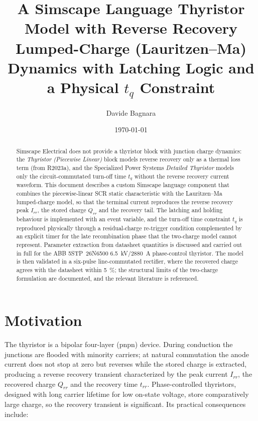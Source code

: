 \documentclass[11pt,a4paper]{article}
\title{A Simscape Language Thyristor Model with Reverse Recovery\\
\large Lumped-Charge (Lauritzen--Ma) Dynamics with Latching Logic and a Physical $t_q$ Constraint}
\author{Davide Bagnara}
\date{\today}
\begin{document}
\maketitle

\begin{abstract}
Simscape Electrical does not provide a thyristor block with junction charge
dynamics: the \emph{Thyristor (Piecewise Linear)} block models reverse
recovery only as a thermal loss term (from R2023a), and the Specialized Power
Systems \emph{Detailed Thyristor} models only the circuit-commutated turn-off
time $t_q$ without the reverse recovery current waveform. This document
describes a custom Simscape language component that combines the
piecewise-linear SCR static characteristic with the Lauritzen--Ma lumped-charge
model, so that the terminal current reproduces the reverse recovery peak
$I_{rr}$, the stored charge $Q_{rr}$ and the recovery tail. The latching and
holding behaviour is implemented with an event variable, and the turn-off time
constraint $t_q$ is reproduced physically through a residual-charge re-trigger
condition complemented by an explicit timer for the late recombination phase that the
two-charge model cannot represent. Parameter extraction from datasheet
quantities is discussed and carried out in full for the ABB 5STP~26N6500
\SI{6.5}{\kilo\volt}/\SI{2880}{\ampere} phase-control thyristor. The model is
then validated in a six-pulse line-commutated rectifier, where the recovered
charge agrees with the datasheet within \SI{5}{\percent}; the structural
limits of the two-charge formulation are documented, and the relevant
literature is referenced.
\end{abstract}

\section{Motivation}

The thyristor is a bipolar four-layer (pnpn) device. During conduction the
junctions are flooded with minority carriers; at natural commutation the anode
current does not stop at zero but reverses while the stored charge is
extracted, producing a reverse recovery transient characterized by the peak
current $I_{rr}$, the recovered charge $Q_{rr}$ and the recovery time
$t_{rr}$. Phase-controlled thyristors, designed with long carrier lifetime for
low on-state voltage, store comparatively large charge, so the recovery
transient is significant. Its practical consequences include:
\end{document}
